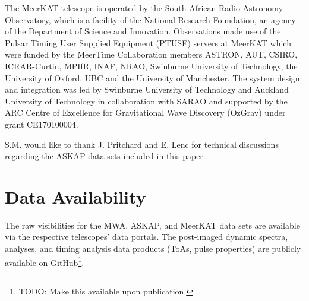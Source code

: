\documentclass[fleqn,usenatbib]{mnras}
\begin{document}
The MeerKAT telescope is operated by the South African Radio Astronomy Observatory, which is a facility of the National Research Foundation, an agency of the Department of Science and Innovation.
  Observations made use of the Pulsar Timing User Supplied Equipment (PTUSE) servers at MeerKAT which were funded by the MeerTime Collaboration members ASTRON, AUT, CSIRO, ICRAR-Curtin, MPIfR, INAF, NRAO, Swinburne University of Technology, the University of Oxford, UBC and the University of Manchester.  The system design and integration was led by Swinburne University of Technology and Auckland University of Technology in collaboration with SARAO and supported by the ARC Centre of Excellence for Gravitational Wave Discovery (OzGrav) under grant CE170100004.

S.M. would like to thank J. Pritchard and E. Lenc for technical discussions regarding the ASKAP data sets included in this paper.

\section*{Data Availability}

The raw visibilities for the MWA, ASKAP, and MeerKAT data sets are available via the respective telescopes' data portals. 
The post-imaged dynamic spectra, analyses, and timing analysis data products (ToAs, pulse properties) are publicly available on GitHub\footnote{TODO: Make this available upon publication.}.
 






\end{document}
